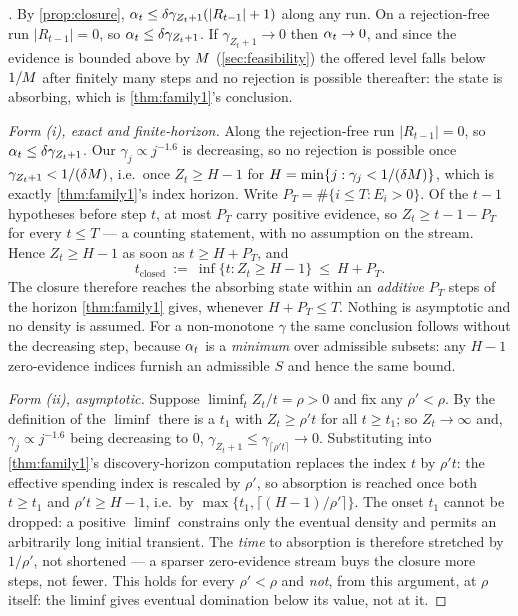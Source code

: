 \begin{proof}[]
By \cref{prop:closure}, $\alpha_t \le \delta\gamma_{Z_t+1}(\lvert R_{t-1}\rvert+1)$ along any run. On a
rejection-free run $\lvert R_{t-1}\rvert = 0$, so $\alpha_t \le \delta\gamma_{Z_t+1}$. If
$\gamma_{Z_t+1}\to0$ then $\alpha_t\to0$, and since the evidence is bounded above by $M$
(\cref{sec:feasibility}) the offered level falls below $1/M$ after finitely many steps and no
rejection is possible thereafter: the state is absorbing, which is \cref{thm:family1}'s conclusion.

\emph{Form (i), exact and finite-horizon.} Along the rejection-free run $\lvert R_{t-1}\rvert=0$, so
$\alpha_t\le\delta\gamma_{Z_t+1}$. Our $\gamma_j\propto j^{-1.6}$ is decreasing, so no rejection is
possible once $\gamma_{Z_t+1} < 1/(\delta M)$, i.e.\ once $Z_t \ge H-1$ for
$H = \min\{j : \gamma_j < 1/(\delta M)\}$, which is exactly \cref{thm:family1}'s index horizon.
Write $P_T = \#\{i\le T : E_i>0\}$. Of the $t-1$ hypotheses before step $t$, at most $P_T$ carry
positive evidence, so $Z_t \ge t-1-P_T$ for every $t\le T$ --- a counting statement, with no
assumption on the stream. Hence $Z_t \ge H-1$ as soon as $t \ge H + P_T$, and
\[
  t_{\text{closed}} \ :=\ \inf\{t : Z_t \ge H-1\} \ \le\ H + P_T .
\]
The closure therefore reaches the absorbing state within an \emph{additive} $P_T$ steps of the horizon
\cref{thm:family1} gives, whenever $H+P_T\le T$. Nothing is asymptotic and no density is assumed. For a
non-monotone $\gamma$ the same conclusion follows without the decreasing step, because $\alpha_t$ is a
\emph{minimum} over admissible subsets: any $H-1$ zero-evidence indices furnish an admissible $S$ and
hence the same bound.

\emph{Form (ii), asymptotic.} Suppose $\liminf_t Z_t/t = \rho > 0$ and fix any $\rho' < \rho$. By the
definition of the $\liminf$ there is a $t_1$ with $Z_t \ge \rho' t$ for all $t \ge t_1$; so
$Z_t\to\infty$ and, $\gamma_j\propto j^{-1.6}$ being decreasing to $0$,
$\gamma_{Z_t+1} \le \gamma_{\lceil\rho' t\rceil}\to0$. Substituting into \cref{thm:family1}'s
discovery-horizon computation replaces the index $t$ by $\rho' t$: the effective spending index is
rescaled by $\rho'$, so absorption is reached once both $t\ge t_1$ and $\rho' t\ge H-1$, i.e.\ by
$\max\{t_1,\lceil(H-1)/\rho'\rceil\}$. The onset $t_1$ cannot be dropped: a positive $\liminf$
constrains only the eventual density and permits an arbitrarily long initial transient. The
\emph{time} to absorption is therefore stretched by $1/\rho'$, not shortened --- a sparser
zero-evidence stream buys the closure more steps, not fewer. This holds for every $\rho'<\rho$ and \emph{not}, from this argument, at $\rho$ itself:
the liminf gives eventual domination below its value, not at it.


\end{proof}
